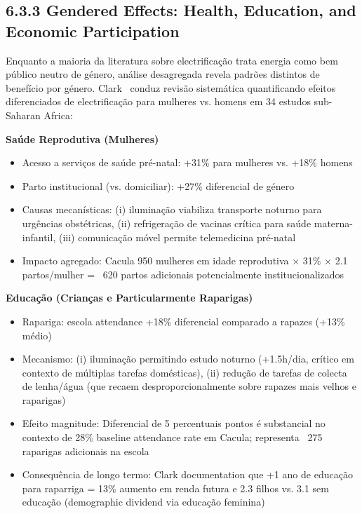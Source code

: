 \documentclass[12pt, a4paper]{article}
\begin{document}
\subsection*{6.3.3 Gendered Effects: Health, Education, and Economic Participation}

Enquanto a maioria da literatura sobre electrificação trata energia como bem público neutro de género, análise desagregada revela padrões distintos de benefício por género. Clark~\citep{Clark2021} conduz revisão sistemática quantificando efeitos diferenciados de electrificação para mulheres vs. homens em 34 estudos sub-Saharan Africa:

\textbf{Saúde Reprodutiva (Mulheres)}
\begin{itemize}
\item Acesso a serviços de saúde pré-natal: +31\% para mulheres vs. +18\% homens
\item Parto institucional (vs. domiciliar): +27\% diferencial de género
\item Causas mecanísticas: (i) iluminação viabiliza transporte noturno para urgências obstétricas, (ii) refrigeração de vacinas crítica para saúde materna-infantil, (iii) comunicação móvel permite telemedicina pré-natal
\item Impacto agregado: Cacula 950 mulheres em idade reprodutiva × 31\% × 2.1 partos/mulher = ~620 partos adicionais potencialmente institucionalizados
\end{itemize}

\textbf{Educação (Crianças e Particularmente Raparigas)}
\begin{itemize}
\item Rapariga: escola attendance +18\% diferencial comparado a rapazes (+13\% médio)
\item Mecanismo: (i) iluminação permitindo estudo noturno (+1.5h/dia, crítico em contexto de múltiplas tarefas domésticas), (ii) redução de tarefas de colecta de lenha/água (que recaem desproporcionalmente sobre rapazes mais velhos e raparigas)
\item Efeito magnitude: Diferencial de 5 percentuais pontos é substancial no contexto de 28\% baseline attendance rate em Cacula; representa ~275 raparigas adicionais na escola
\item Consequência de longo termo: Clark documentation que +1 ano de educação para raparriga = 13\% aumento em renda futura e 2.3 filhos vs. 3.1 sem educação (demographic dividend via educação feminina)
\end{itemize}
\end{document}
